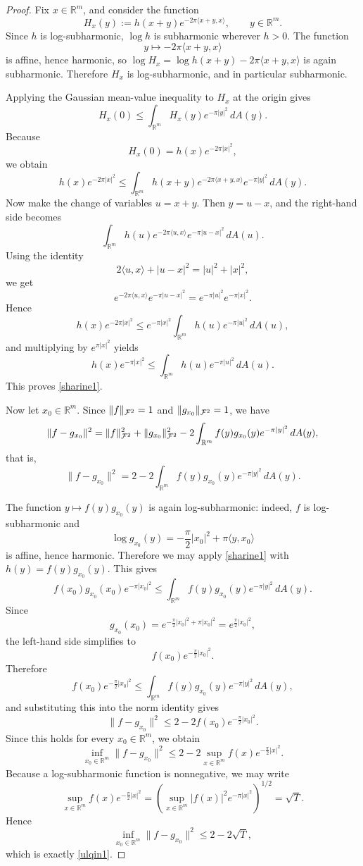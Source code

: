 \documentclass[a4paper,10pt]{amsart}
\newcommand{\Fock}{\mcalF^2}
\begin{document}
\begin{proof}
Fix \(x\in \mathbb{R}^m\), and consider the function
\[
H_x(y):=h(x+y)e^{-2\pi \langle x+y,x\rangle}, \qquad y\in \mathbb{R}^m.
\]
Since \(h\) is log-subharmonic, \(\log h\) is subharmonic wherever \(h>0\). The function
\[
y\mapsto -2\pi \langle x+y,x\rangle
\]
is affine, hence harmonic, so \(\log H_x=\log h(x+y)-2\pi\langle x+y,x\rangle\) is again subharmonic. Therefore \(H_x\) is log-subharmonic, and in particular subharmonic.

Applying the Gaussian mean-value inequality to \(H_x\) at the origin gives
\[
H_x(0)\le \int_{\mathbb{R}^m} H_x(y)e^{-\pi |y|^2}\,dA(y).
\]
Because
\[
H_x(0)=h(x)e^{-2\pi |x|^2},
\]
we obtain
\[
h(x)e^{-2\pi |x|^2}
\le
\int_{\mathbb{R}^m} h(x+y)e^{-2\pi\langle x+y,x\rangle}e^{-\pi|y|^2}\,dA(y).
\]
Now make the change of variables \(u=x+y\). Then \(y=u-x\), and the right-hand side becomes
\[
\int_{\mathbb{R}^m} h(u)e^{-2\pi\langle u,x\rangle}e^{-\pi|u-x|^2}\,dA(u).
\]
Using the identity
\[
2\langle u,x\rangle+|u-x|^2=|u|^2+|x|^2,
\]
we get
\[
e^{-2\pi\langle u,x\rangle}e^{-\pi|u-x|^2}
=
e^{-\pi|u|^2}e^{-\pi|x|^2}.
\]
Hence
\[
h(x)e^{-2\pi |x|^2}
\le
e^{-\pi|x|^2}\int_{\mathbb{R}^m} h(u)e^{-\pi|u|^2}\,dA(u),
\]
and multiplying by \(e^{\pi|x|^2}\) yields
\[
h(x)e^{-\pi |x|^2}\le  \int_{\mathbb{R}^m} h(u)e^{-\pi |u|^2}\,dA(u).
\]
This proves \eqref{sharine1}.

Now let \(x_0\in \mathbb{R}^m\). Since \(\|f\|_{\Fock}=1\) and \(\|g_{x_0}\|_{\Fock}=1\), we have
\[
\|f-g_{x_0}\|^2
=
\|f\|_{\Fock}^2+\|g_{x_0}\|_{\Fock}^2
-2\int_{\mathbb{R}^m} f(y)g_{x_0}(y)e^{-\pi|y|^2}\,dA(y),
\]
that is,
\[
\|f-g_{x_0}\|^2
=
2-2\int_{\mathbb{R}^m} f(y)g_{x_0}(y)e^{-\pi|y|^2}\,dA(y).
\]

The function \(y\mapsto f(y)g_{x_0}(y)\) is again log-subharmonic: indeed, \(f\) is log-subharmonic and
\[
\log g_{x_0}(y)= -\frac{\pi}{2}|x_0|^2+\pi\langle y,x_0\rangle
\]
is affine, hence harmonic. Therefore we may apply \eqref{sharine1} with \(h(y)=f(y)g_{x_0}(y)\). This gives
\[
f(x_0)g_{x_0}(x_0)e^{-\pi|x_0|^2}
\le
\int_{\mathbb{R}^m} f(y)g_{x_0}(y)e^{-\pi|y|^2}\,dA(y).
\]
Since
\[
g_{x_0}(x_0)
=
e^{-\frac{\pi}{2}|x_0|^2+\pi|x_0|^2}
=
e^{\frac{\pi}{2}|x_0|^2},
\]
the left-hand side simplifies to
\[
f(x_0)e^{-\frac{\pi}{2}|x_0|^2}.
\]
Therefore
\[
f(x_0)e^{-\frac{\pi}{2}|x_0|^2}
\le
\int_{\mathbb{R}^m} f(y)g_{x_0}(y)e^{-\pi|y|^2}\,dA(y),
\]
and substituting this into the norm identity gives
\[
\|f-g_{x_0}\|^2
\le
2-2f(x_0)e^{-\frac{\pi}{2}|x_0|^2}.
\]
Since this holds for every \(x_0\in\mathbb{R}^m\), we obtain
\[
\inf_{x_0\in\mathbb{R}^m}\|f-g_{x_0}\|^2
\le
2-2\sup_{x\in\mathbb{R}^m} f(x)e^{-\frac{\pi}{2}|x|^2}.
\]
Because a log-subharmonic function is nonnegative, we may write
\[
\sup_{x\in\mathbb{R}^m} f(x)e^{-\frac{\pi}{2}|x|^2}
=
\left(\sup_{x\in\mathbb{R}^m}|f(x)|^2e^{-\pi|x|^2}\right)^{1/2}
=
\sqrt{T}.
\]
Hence
\[
\inf_{x_0\in\mathbb{R}^m}\|f-g_{x_0}\|^2\le 2-2\sqrt{T},
\]
which is exactly \eqref{ulqin1}.
\end{proof}
\end{document}
